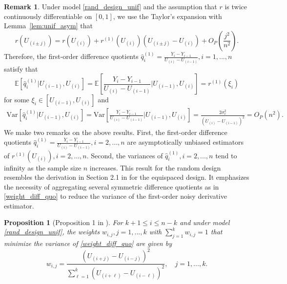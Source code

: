 \documentclass{uwstat572}
\newtheorem{prop}[theorem]{Proposition}
\theoremstyle{definition}
\newtheorem{Remark}{Remark}
\renewcommand{\hat}{\widehat}
\theoremstyle{theorem}
\begin{document}
\begin{Remark}
\label{remark:O_n}
Under model \eqref{rand_design_unif} and the assumption that $r$ is twice continuously differentiable on $[0,1]$, we use the Taylor's expansion with Lemma~\ref{lem:unif_asym} that
$$r(U_{(i\pm j)}) = r(U_{(i)}) + r^{(1)}(U_{(i)}) \left(U_{(i\pm j)} - U_{(i)}\right) + O_P\left(\frac{j^2}{n^2}\right).$$
Therefore, the first-order difference quotients $\hat{q}_i^{(1)} = \frac{Y_i - Y_{i-1}}{U_{(i)}- U_{(i-1)}}, i=1,...,n$ satisfy that
$$\mathbb{E}\left[\hat{q}_i^{(1)} \big| U_{(i-1)}, U_{(i)}\right] = \mathbb{E}\left[\frac{Y_i - Y_{i-1}}{U_{(i)}- U_{(i-1)}} \Big| U_{(i-1)}, U_{(i)}\right] = r^{(1)}(\xi_i)$$
for some $\xi_i \in \left[U_{(i-1)}, U_{(i)}\right]$ and
\begin{align*}
\mathrm{Var}\left[\hat{q}_i^{(1)} \big| U_{(i-1)}, U_{(i)}\right] = \mathrm{Var}\left[\frac{Y_i - Y_{i-1}}{U_{(i)}- U_{(i-1)}} \Big| U_{(i-1)}, U_{(i)}\right] = \frac{2\sigma_e^2}{\left(U_{(i)} - U_{(i-1)}\right)^2} = O_P\left(n^2\right).
\end{align*}
We make two remarks on the above results. First, the first-order difference quotients $\hat{q}_i^{(1)} = \frac{Y_i - Y_{i-1}}{U_{(i)}- U_{(i-1)}}, i=2,...,n$ are asymptotically unbiased estimators of $r^{(1)}(U_{(i)}),i=2,...,n$. Second, the variances of $\hat{q}_i^{(1)}, i=2,...,n$ tend to infinity as the sample size $n$ increases. This result for the random design resembles the derivation in Section 2.1 in \cite{de2013derivative} for the equispaced design. It emphasizes the necessity of aggregating several symmetric difference quotients as in \eqref{weight_diff_quo} to reduce the variance of the first-order noisy derivative estimator.\\
\end{Remark}

\begin{prop}[Proposition 1 in \citealt{liu2020smoothed}]
\label{prop:weight_first}
For $k+1\leq i\leq n-k$ and under model \eqref{rand_design_unif}, the weights $w_{i,j},j=1,...,k$ with $\sum_{j=1}^k w_{i,j}=1$ that minimize the variance of \eqref{weight_diff_quo} are given by 
$$w_{i,j} = \frac{\left(U_{(i+j)} - U_{(i-j)}\right)^2}{\sum_{\ell=1}^k \left(U_{(i+\ell)} - U_{(i-\ell)}\right)^2}, \quad j=1,...,k.$$
\end{prop}
\end{document}
